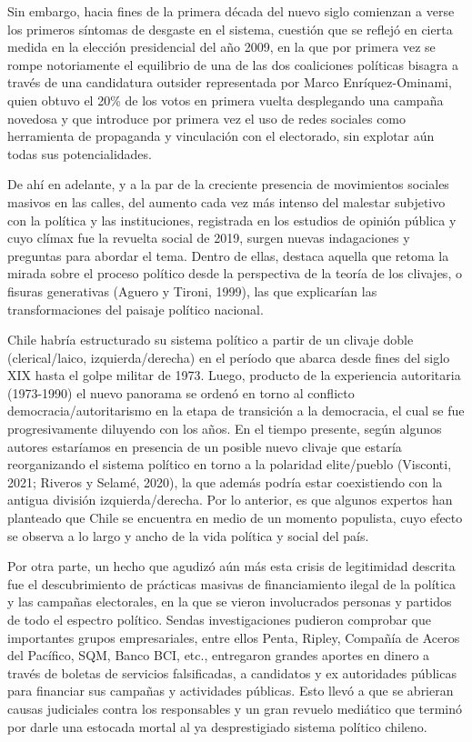 \documentclass[
  10pt,
  letterpaper,
]{report}
\begin{document}
Sin embargo, hacia fines de la primera década del nuevo siglo comienzan
a verse los primeros síntomas de desgaste en el sistema, cuestión que se
reflejó en cierta medida en la elección presidencial del año 2009, en la
que por primera vez se rompe notoriamente el equilibrio de una de las
dos coaliciones políticas bisagra a través de una candidatura outsider
representada por Marco Enríquez-Ominami, quien obtuvo el 20\% de los
votos en primera vuelta desplegando una campaña novedosa y que introduce
por primera vez el uso de redes sociales como herramienta de propaganda
y vinculación con el electorado, sin explotar aún todas sus
potencialidades.

De ahí en adelante, y a la par de la creciente presencia de movimientos
sociales masivos en las calles, del aumento cada vez más intenso del
malestar subjetivo con la política y las instituciones, registrada en
los estudios de opinión pública y cuyo clímax fue la revuelta social de
2019, surgen nuevas indagaciones y preguntas para abordar el tema.
Dentro de ellas, destaca aquella que retoma la mirada sobre el proceso
político desde la perspectiva de la teoría de los clivajes, o fisuras
generativas (Aguero y Tironi, 1999), las que explicarían las
transformaciones del paisaje político nacional.

Chile habría estructurado su sistema político a partir de un clivaje
doble (clerical/laico, izquierda/derecha) en el período que abarca desde
fines del siglo XIX hasta el golpe militar de 1973. Luego, producto de
la experiencia autoritaria (1973-1990) el nuevo panorama se ordenó en
torno al conflicto democracia/autoritarismo en la etapa de transición a
la democracia, el cual se fue progresivamente diluyendo con los años. En
el tiempo presente, según algunos autores estaríamos en presencia de un
posible nuevo clivaje que estaría reorganizando el sistema político en
torno a la polaridad elite/pueblo (Visconti, 2021; Riveros y Selamé,
2020), la que además podría estar coexistiendo con la antigua división
izquierda/derecha. Por lo anterior, es que algunos expertos han
planteado que Chile se encuentra en medio de un momento populista, cuyo
efecto se observa a lo largo y ancho de la vida política y social del
país.

Por otra parte, un hecho que agudizó aún más esta crisis de legitimidad
descrita fue el descubrimiento de prácticas masivas de financiamiento
ilegal de la política y las campañas electorales, en la que se vieron
involucrados personas y partidos de todo el espectro político. Sendas
investigaciones pudieron comprobar que importantes grupos empresariales,
entre ellos Penta, Ripley, Compañía de Aceros del Pacífico, SQM, Banco
BCI, etc., entregaron grandes aportes en dinero a través de boletas de
servicios falsificadas, a candidatos y ex autoridades públicas para
financiar sus campañas y actividades públicas. Esto llevó a que se
abrieran causas judiciales contra los responsables y un gran revuelo
mediático que terminó por darle una estocada mortal al ya desprestigiado
sistema político chileno.
\end{document}
